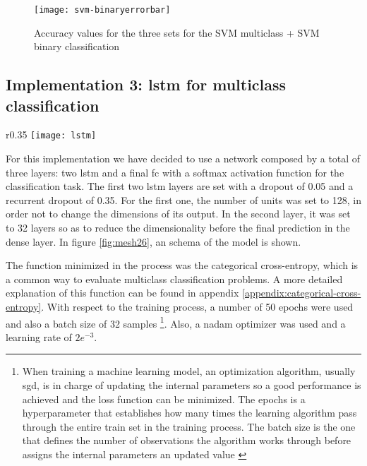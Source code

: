 	\begin{figure}[H]
		\centering
		\captionsetup{justification=centering}
		\texttt{[image: svm-binaryerrorbar]}
		\caption{Accuracy values for the three sets for the SVM multiclass + SVM binary classification}
		\label{fig:mesh25}
	\end{figure}
	
\subsection{Implementation 3: \acrshort{lstm} for multiclass classification}

	\begin{wrapfigure}{r}{0.35\textwidth}
		\centering
		\captionsetup{justification=centering}
		\texttt{[image: lstm]}
		\caption{LSTM architecture}
		\label{fig:mesh26}
	\end{wrapfigure}
	
	For this implementation we have decided to use a network composed by a total of three layers: two \acrshort{lstm} and a final \acrlong{fc} with a softmax activation function for the classification task. The first two \acrshort{lstm} layers are set with a dropout of 0.05 and a recurrent dropout of 0.35. For the first one, the number of units was set to 128, in order not to change the dimensions of its output. In the second layer, it was set to 32 layers so as to reduce the dimensionality before the final prediction in the dense layer. In figure \ref{fig:mesh26}, an schema of the model is shown.
	
	The function minimized in the process was the categorical cross-entropy, which is a common way to evaluate multiclass classification problems. A more detailed explanation of this function can be found in appendix \ref{appendix:categorical-cross-entropy}. With respect to the training process, a number of 50 epochs were used and also a batch size of 32 samples \footnote{When training a machine learning model, an optimization algorithm, usually \acrshort{sgd}, is in charge of updating the internal parameters so a good performance is achieved and the loss function can be minimized. The epochs is a hyperparameter that establishes how many times the learning algorithm pass through the entire train set in the training process. The batch size is the one that defines the number of observations the algorithm works through before assigns the internal parameters an updated value \cite{Browniee2018a}}.  Also, a \acrshort{nadam} optimizer was used and a learning rate of $2e^{-3}$.
	
